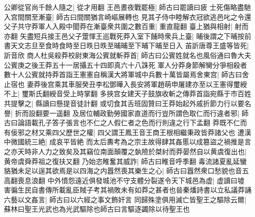 公卿從官尚千餘人隨之|{
	從才用翻}
王邑晝夜戰罷極|{
	師古曰罷讀曰疲}
士死傷略盡馳入宫間關至漸臺|{
	師古曰間關猶言崎嶇展轉也}
見其子侍中睦解衣冠欲逃邑叱之令還父子共守莽軍人入殿中聞莽在漸臺衆共圍之數百重|{
	重直龍翻}
臺上猶與相射|{
	射而亦翻}
矢盡短兵接王邑父子䠠惲王巡戰死莽入室下餔時衆兵上臺|{
	晡後謂之下晡按前書天文志旦至食時食時至日昳日昳至晡晡至下晡下晡至日入}
苖訢唐尊王盛等皆死|{
	訢音欣}
商人杜吳殺莽校尉東海公賓就斬莽首|{
	師古曰公賓姓就名也風俗通曰魯大夫公賓庚之後王莽五十一居攝五十四即真六十八誅死}
軍人分莽身節解臠分爭相殺者數十人公賓就持莽首詣王憲憲自稱漢大將軍城中兵數十萬皆屬焉舍東宫|{
	師古曰舍止宿也}
妻莽後宫乘其車服癸丑李松鄧曄入長安將軍趙萌申屠建亦至以王憲得璽綬不上|{
	璽斯氏翻綬音受上時掌翻}
多挾宫女建天子鼓旗收斬之傳莽首詣宛縣于市百姓共提擊之|{
	縣讀曰懸提音徒計翻}
或切食其舌班固贊曰王莽始起外戚折節力行以要名譽|{
	折而設翻要一遥翻}
及居位輔政勤勞國家直道而行豈所謂色取仁而行違者邪|{
	師古曰論語載孔子答子張言也不仁之人假仁者之色而行則違之行下孟翻}
莽既不仁而有佞邪之材又乘四父歷世之權|{
	四父謂王鳳王音王商王根相繼秉政皆莽諸父也}
遭漢中微國統三絶|{
	成哀平皆絶}
而太后夀考為之宗主故得肆其姦慝以成簒盜之禍推是言之亦天時非人力之致矣及其竊位南面顛覆之埶險於桀紂而莽晏然自以黄虞復出也|{
	黄帝虞舜莽祖之復扶又翻}
乃始恣睢奮其威詐|{
	師古曰睢音呼季翻}
毒流諸夏亂延蠻貉猶未足以逞其欲焉是以四海之内囂然喪其樂生之心|{
	師古曰囂然衆口愁貌也音五高翻喪息浪翻}
中外憤怨遠近俱發城池不守支體分裂遂令天下城邑為虚|{
	虚讀曰墟}
害徧生民自書傳所載亂臣賊子考其禍敗未有如莽之甚者也㫺秦燔詩書以立私議莽誦六藝以文姦言|{
	師古曰以六經之事文飾奸言}
同歸殊塗俱用滅亡皆聖王之驅除云爾|{
	蘇林曰聖王光武也為光武驅除也師古曰言驅逐蠲除以待聖王也}


